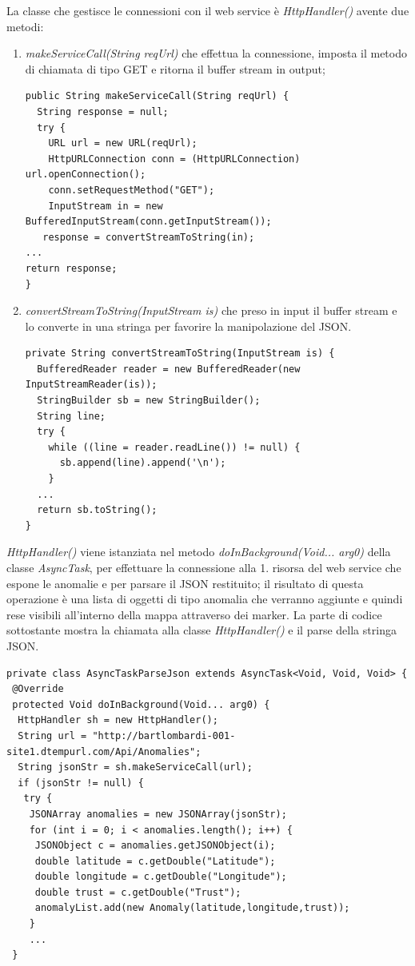 \documentclass[a4paper, 11pt]{article} %
\begin{document}
La classe che gestisce le connessioni con il web service è \textit{HttpHandler()} avente due metodi: 
\begin{enumerate}
	\item \textit{makeServiceCall(String reqUrl)} che effettua la connessione, imposta il metodo di chiamata di tipo GET e ritorna il buffer stream in output;
\begin{lstlisting}
public String makeServiceCall(String reqUrl) {
  String response = null;
  try {
    URL url = new URL(reqUrl);
    HttpURLConnection conn = (HttpURLConnection) url.openConnection();
    conn.setRequestMethod("GET");
    InputStream in = new BufferedInputStream(conn.getInputStream());
   response = convertStreamToString(in);
...
return response;
}
\end{lstlisting}
	\item \textit{convertStreamToString(InputStream is)} che preso in input il buffer stream e lo converte in una stringa per favorire la manipolazione del JSON.
\begin{lstlisting}
private String convertStreamToString(InputStream is) {
  BufferedReader reader = new BufferedReader(new InputStreamReader(is));
  StringBuilder sb = new StringBuilder();
  String line;
  try {
    while ((line = reader.readLine()) != null) {
      sb.append(line).append('\n');
    }
  ...
  return sb.toString();
}
\end{lstlisting}	
\end{enumerate}
\textit{HttpHandler()} viene istanziata nel metodo \textit{doInBackground(Void... arg0)} della classe \textit{AsyncTask}, per effettuare la connessione alla 1. risorsa del web service che espone le anomalie e per parsare il JSON restituito; il risultato di questa operazione è una lista di oggetti di tipo anomalia che verranno aggiunte e quindi rese visibili all'interno della mappa attraverso dei marker. La parte di codice sottostante mostra la chiamata alla classe \textit{HttpHandler()} e il parse della stringa JSON.
\begin{lstlisting}
private class AsyncTaskParseJson extends AsyncTask<Void, Void, Void> {
 @Override
 protected Void doInBackground(Void... arg0) {
  HttpHandler sh = new HttpHandler();
  String url = "http://bartlombardi-001-site1.dtempurl.com/Api/Anomalies";
  String jsonStr = sh.makeServiceCall(url);
  if (jsonStr != null) {
   try {
    JSONArray anomalies = new JSONArray(jsonStr);
    for (int i = 0; i < anomalies.length(); i++) {
     JSONObject c = anomalies.getJSONObject(i);
     double latitude = c.getDouble("Latitude");
     double longitude = c.getDouble("Longitude");
     double trust = c.getDouble("Trust");
     anomalyList.add(new Anomaly(latitude,longitude,trust));
    }
    ...
 }
\end{lstlisting}
\end{document}
